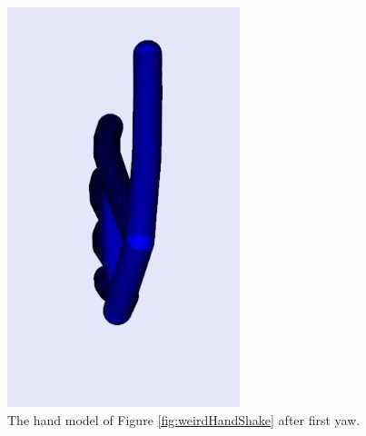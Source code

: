 \begin{figure}[H]
\centering
\includegraphics[scale=0.65]{Figures/4_afterFirstYaw.JPG}
\caption[After First Yaw]{The hand model of Figure \ref{fig:weirdHandShake} after first yaw.}
\label{fig:afterFirstYaw}
\end{figure}

